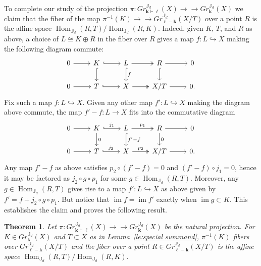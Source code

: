 \documentclass{amsart}
\numberwithin{equation}{section}
\newtheorem{theorem}{Theorem}[section]
\theoremstyle{definition}
\def\JJ{\mathbb{J}}
\def\bfk{\mathbf{k}}
\def\bfl{{\ensuremath{\boldsymbol\ell}}}
\def\Hom{\operatorname{Hom}}
\def\im{\operatorname{im}}
\newcommand{\partition}{\vdash}
\newcommand{\into}{\hookrightarrow}
\newcommand{\onto}{\to\!\!\!\!\!\to}
\begin{document}
To complete our study of the projection $\pi:Gr^{\JJ_d}_{\bfk\partition\bfl}(X)\onto Gr^{\JJ_d}_\bfk(X)$ we claim that the fiber of the map $\pi^{-1}(K)\onto Gr^{\JJ_d}_{\bfl-\bfk}(X/T)$ over a point $R$ is the affine space $\Hom_{\JJ_d}(R,T)/\Hom_{\JJ_d}(R,K)$.  Indeed, given $K$, $T$, and $R$ as above, a choice of $L\cong K\oplus R$ in the fiber over $R$ gives a map $f:L\into X$ making the following diagram commute:
\[\begin{tikzcd}
  0 \arrow{r} & K\arrow[hook]{r}\arrow[hook]{d} & L\arrow[two heads]{r}\arrow[hook,"f"]{d}& R\arrow{r}\arrow[hook]{d} & 0 \\
  0 \arrow{r} & T\arrow[hook]{r} & X\arrow[two heads]{r} & X/T\arrow{r} & 0.
\end{tikzcd}\]
Fix such a map $f:L\into X$.  Given any other map $f':L\into X$ making the diagram above commute, the map $f'-f:L\to X$ fits into the commutative diagram
\[\begin{tikzcd}
  0 \arrow{r} & K\arrow[hook, "j_1"]{r}\arrow["0"]{d} & L\arrow[two heads, "p_1"]{r}\arrow[hook,"f'-f"]{d}& R\arrow{r}\arrow["0"]{d} & 0 \\
  0 \arrow{r} & T\arrow[hook, "j_2"]{r} & X\arrow[two heads, "p_2"]{r} & X/T\arrow{r} & 0.
\end{tikzcd}\]
Any map $f'-f$ as above satisfies $p_2\circ(f'-f)=0$ and $(f'-f)\circ j_1=0$, hence it may be factored as $j_2\circ g\circ p_1$ for some $g\in\Hom_{\JJ_d}(R,T)$.  Moreover, any $g\in\Hom_{\JJ_d}(R,T)$ gives rise to a map $f':L\into X$ as above given by $f'=f+j_2\circ g\circ p_1$.  But notice that $\im f=\im f'$ exactly when $\im g\subset K$.  This establishes the claim and proves the following result.
\begin{theorem}
  Let $\pi:Gr^{\JJ_d}_{\bfk\partition\bfl}(X)\onto Gr^{\JJ_d}_\bfk(X)$ be the natural projection.  For $K\in Gr^{\JJ_d}_\bfk(X)$ and $T\subset X$ as in Lemma~\ref{le:special summand}, $\pi^{-1}(K)$ fibers over $Gr^{\JJ_d}_{\bfl-\bfk}(X/T)$ and the fiber over a point $R\in Gr^{\JJ_d}_{\bfl-\bfk}(X/T)$ is the affine space $\Hom_{\JJ_d}(R,T)/\Hom_{\JJ_d}(R,K)$.
\end{theorem}
\end{document}
